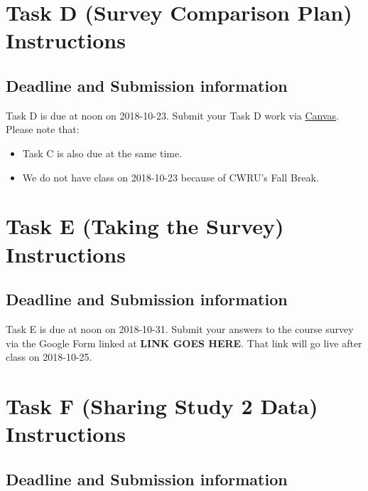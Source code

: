 \documentclass[]{book}
\providecommand{\tightlist}{%
  \setlength{\itemsep}{0pt}\setlength{\parskip}{0pt}}
\theoremstyle{definition}
\theoremstyle{definition}
\theoremstyle{definition}
\theoremstyle{remark}
\begin{document}
\hypertarget{taskD}{%
\chapter{Task D (Survey Comparison Plan) Instructions}\label{taskD}}

\hypertarget{deadline-and-submission-information-3}{%
\section{Deadline and Submission
information}\label{deadline-and-submission-information-3}}

Task D is due at noon on 2018-10-23. Submit your Task D work via
\href{https://canvas.case.edu/}{Canvas}. Please note that:

\begin{itemize}
\tightlist
\item
  Task C is also due at the same time.
\item
  We do not have class on 2018-10-23 because of CWRU's Fall Break.
\end{itemize}

\hypertarget{taskE}{%
\chapter{Task E (Taking the Survey) Instructions}\label{taskE}}

\hypertarget{deadline-and-submission-information-4}{%
\section{Deadline and Submission
information}\label{deadline-and-submission-information-4}}

Task E is due at noon on 2018-10-31. Submit your answers to the course
survey via the Google Form linked at \textbf{LINK GOES HERE}. That link
will go live after class on 2018-10-25.

\hypertarget{taskF}{%
\chapter{Task F (Sharing Study 2 Data) Instructions}\label{taskF}}

\hypertarget{deadline-and-submission-information-5}{%
\section{Deadline and Submission
information}\label{deadline-and-submission-information-5}}
\end{document}
